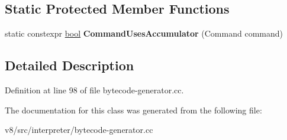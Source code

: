 \subsection*{Static Protected Member Functions}
\begin{DoxyCompactItemize}
\item 
\mbox{\label{classv8_1_1internal_1_1interpreter_1_1BytecodeGenerator_1_1ControlScope_a9907edb461443a2da7d7d4983f3091bb}} 
static constexpr \mbox{\hyperlink{classbool}{bool}} {\bfseries Command\+Uses\+Accumulator} (Command command)
\end{DoxyCompactItemize}


\subsection{Detailed Description}


Definition at line 98 of file bytecode-\/generator.\+cc.



The documentation for this class was generated from the following file\+:\begin{DoxyCompactItemize}
\item 
v8/src/interpreter/bytecode-\/generator.\+cc\end{DoxyCompactItemize}

